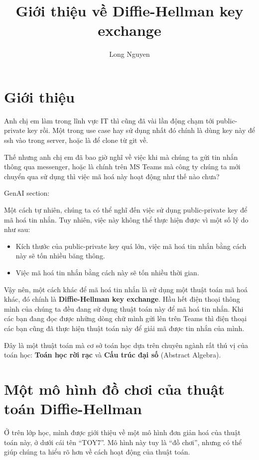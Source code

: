 \documentclass[a4paper,12pt]{article}
\title{Giới thiệu về Diffie-Hellman key exchange}
\date{}
\author{Long Nguyen}
\begin{document}
\maketitle

\section{Giới thiệu}

Anh chị em làm trong lĩnh vực IT thì cũng đã vài lần động chạm tới public-private key rồi.
Một trong use case hay sử dụng nhất đó chính là dùng key này để ssh vào trong server,
hoặc là để clone từ git về.

Thế nhưng anh chị em đã bao giờ nghĩ về việc khi mà chúng ta gửi tin nhắn thông qua messenger,
hoặc là chính trên MS Teams mà công ty chúng ta mới chuyển qua sử dụng thì việc mã hoá này hoạt động như thế nào chưa?

\begin{mdframed}
    GenAI section:

    Một cách tự nhiên, chúng ta có thể nghĩ đến việc sử dụng public-private key để mã hoá tin nhắn.
    Tuy nhiên, việc này không thể thực hiện được vì một số lý do như sau:
    \begin{itemize}
        \item Kích thước của public-private key quá lớn, việc mã hoá tin nhắn bằng cách này sẽ tốn nhiều băng thông.
        \item Việc mã hoá tin nhắn bằng cách này sẽ tốn nhiều thời gian.
    \end{itemize}
\end{mdframed}

Vậy nên, một cách khác để mã hoá tin nhắn là sử dụng một thuật toán mã hoá khác,
đó chính là \textbf{Diffie-Hellman key exchange}. Hầu hết điện thoại thông mình của chúng ta
đều đang sử dụng thuật toán này để mã hoá tin nhắn. Khi các bạn đang đọc được những dòng chữ
mình gửi lên trên Teams thì điện thoại các bạn cũng đã thực hiện thuật toán này để giải mã
được tin nhắn của mình.

Đây là một thuật toán mà cơ sở toán học dựa trên chuyên ngành rất thú vị của toán học:
\textbf{Toán học rời rạc} và \textbf{Cấu trúc đại số} (Abstract Algebra).

\section{Một mô hình đồ chơi của thuật toán Diffie-Hellman}

Ở trên lớp học, mình được giới thiệu về một mô hình đơn giản hoá của thuật toán này,
ở dưới cái tên ``TOY7''. Mô hình này tuy là ``đồ chơi'', nhưng có thể giúp chúng ta
hiểu rõ hơn về cách hoạt động của thuật toán.
\end{document}
